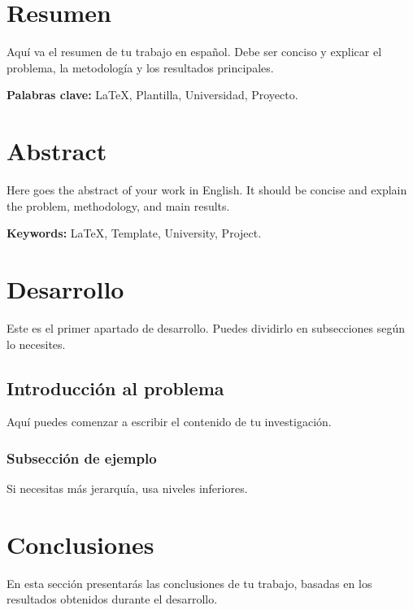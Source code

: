 \documentclass[12pt,a4paper]{article}
\begin{document}
\doublespacing %

\section*{Resumen}
Aquí va el resumen de tu trabajo en español. Debe ser conciso y explicar el problema, la metodología y los resultados principales.

\vspace{0.5cm}
\noindent\textbf{Palabras clave:} LaTeX, Plantilla, Universidad, Proyecto.

\section*{Abstract}
Here goes the abstract of your work in English. It should be concise and explain the problem, methodology, and main results.

\vspace{0.5cm}
\noindent\textbf{Keywords:} LaTeX, Template, University, Project.
\newpage

\tableofcontents
\newpage

\section{Desarrollo}
Este es el primer apartado de desarrollo. Puedes dividirlo en subsecciones según lo necesites.

\subsection{Introducción al problema}
Aquí puedes comenzar a escribir el contenido de tu investigación.

\subsubsection{Subsección de ejemplo}
Si necesitas más jerarquía, usa niveles inferiores.


\section{Conclusiones}
En esta sección presentarás las conclusiones de tu trabajo, basadas en los resultados obtenidos durante el desarrollo.
\end{document}
